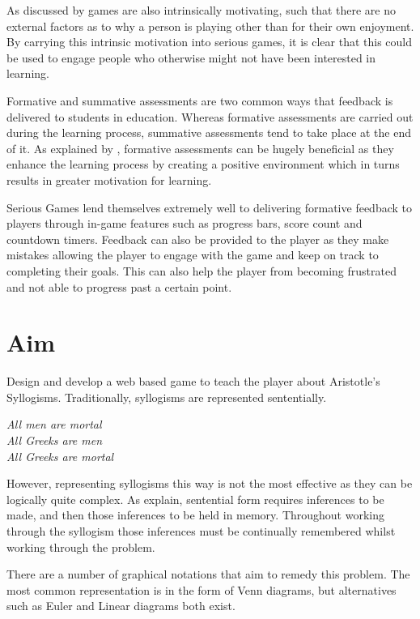 \documentclass[12pt,a4paper]{report}
\newenvironment{tightcenter}{%
  \setlength\topsep{0pt}
  \setlength\parskip{0pt}
  \begin{center}
}{%
  \end{center}
}
\begin{document}
As discussed by \cite{malone1981toward} games are also intrinsically motivating, such that there are no external factors as to why a person is playing other than for their own enjoyment. By carrying this intrinsic motivation into serious games, it is clear that this could be used to engage people who otherwise might not have been interested in learning. 

Formative and summative assessments are two common ways that feedback is delivered to students in education. Whereas formative assessments are carried out during the learning process, summative assessments tend to take place at the end of it. As explained by \cite{irons2007enhancing}, formative assessments can be hugely beneficial as they enhance the learning process by creating a positive environment which in turns results in greater motivation for learning. 

Serious Games lend themselves extremely well to delivering formative feedback to players through in-game features such as progress bars, score count and countdown timers. Feedback can also be provided to the player as they make mistakes allowing the player to engage with the game and keep on track to completing their goals. This can also help the player from becoming frustrated and not able to progress past a certain point.


\section{Aim}
Design and develop a web based game to teach the player about Aristotle's Syllogisms. Traditionally, syllogisms are represented sententially.


\begin{tightcenter}
\textit{All men are mortal}\\
\textit{All Greeks are men}\\
\textit{All Greeks are mortal}\\
\end{tightcenter}

However, representing syllogisms this way is not the most effective as they can be logically quite complex. As \cite{larkin1987diagram} explain, sentential form requires inferences to be made, and then those inferences to be held in memory. Throughout working through the syllogism those inferences must be continually remembered whilst working through the problem.

There are a number of graphical notations that aim to remedy this problem. The most common representation is in the form of Venn diagrams, but alternatives such as Euler and Linear diagrams both exist. 
\end{document}
